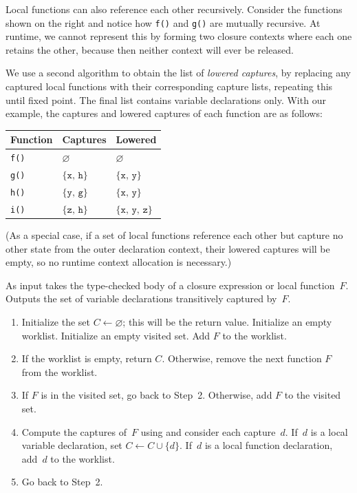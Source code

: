 \documentclass[../generics]{subfiles}
\begin{document}
Local functions can also reference each other recursively. Consider the functions shown on the right and notice how \texttt{f()} and \texttt{g()} are mutually recursive. At runtime, we cannot represent this by forming two closure contexts where each one retains the other, because then neither context will ever be released.

We use a second algorithm to obtain the list of \emph{lowered captures}, by replacing any captured local functions with their corresponding capture lists, repeating this until fixed point. The final list contains variable declarations only. With our example, the captures and lowered captures of each function are as follows:

\begin{center}
\begin{tabular}{lll}
\toprule
\textbf{Function}&\textbf{Captures}&\textbf{Lowered}\\
\midrule
\texttt{f()}&$\varnothing$&$\varnothing$\\
\texttt{g()}&$\{\texttt{x},\,\texttt{h}\}$&$\{\texttt{x},\,\texttt{y}\}$\\
\texttt{h()}&$\{\texttt{y},\,\texttt{g}\}$&$\{\texttt{x},\,\texttt{y}\}$\\
\texttt{i()}&$\{\texttt{z},\,\texttt{h}\}$&$\{\texttt{x},\,\texttt{y},\,\texttt{z}\}$\\
\bottomrule
\end{tabular}
\end{center}

(As a special case, if a set of local functions reference each other but capture no other state from the outer declaration context, their lowered captures will be empty, so no runtime context allocation is necessary.)

\begin{algorithm}
As input takes the type-checked body of a closure expression or local function~$F$. Outputs the set of variable declarations transitively captured by~$F$.
\begin{enumerate}
\item Initialize the set $C\leftarrow\varnothing$; this will be the return value. Initialize an empty worklist. Initialize an empty visited set. Add $F$ to the worklist.
\item If the worklist is empty, return $C$. Otherwise, remove the next function $F$ from the worklist.
\item If $F$ is in the visited set, go back to Step~2. Otherwise, add $F$ to the visited set.
\item Compute the captures of~$F$ using  and consider each capture~$d$. If~$d$ is a local variable declaration, set $C\leftarrow C\cup\{d\}$. If~$d$ is a local function declaration, add~$d$ to the worklist.
\item Go back to Step~2.
\end{enumerate}
\end{algorithm}
\end{document}
